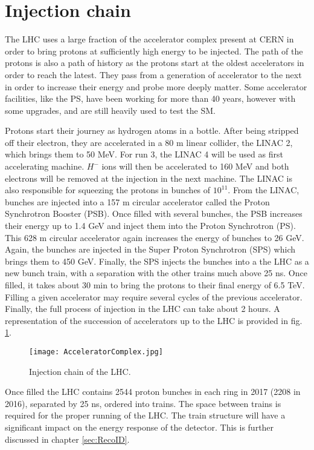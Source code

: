 \section{Injection chain}
\label{sec:org3f71f89}

The LHC uses a large fraction of the accelerator complex present at CERN in order to bring protons at sufficiently high energy to be injected.
The path of the protons is also a path of history as the protons start at the oldest accelerators in order to reach the latest.
They pass from a generation of accelerator to the next in order to increase their energy and probe more deeply matter.
Some accelerator facilities, like the PS, have been working for more than 40 years, however with some upgrades,  and are still heavily used to test the SM.

Protons start their journey as hydrogen atoms in a bottle.
After being stripped off their electron, they are accelerated in a 80 m linear collider, the LINAC 2, which brings them to 50 MeV.
For run 3, the LINAC 4 will be used as first accelerating machine.
$H^-$ ions will then be accelerated to 160 MeV and both electrons will be removed at the injection in the next machine.
The LINAC is also responsible for squeezing the protons in bunches of $10^{11}$.
From the LINAC, bunches are injected into a 157 m circular accelerator called the Proton Synchrotron Booster (PSB).
Once filled with several bunches, the PSB increases their energy up to 1.4 GeV and inject them into the Proton Synchrotron (PS).
This 628 m circular accelerator again increases the energy of bunches to 26 GeV.
Again, the bunches are injected in the Super Proton Synchrotron (SPS) which brings them to 450 GeV.
Finally, the SPS injects the bunches into a the LHC as a new bunch train, with a separation with the other trains much above 25 ns.
Once filled, it takes about 30 min to bring the protons to their final energy of 6.5 TeV.
Filling a given accelerator may require several cycles of the previous accelerator.
Finally, the full process of injection in the LHC can take about 2 hours.
A representation of the succession of accelerators up to the LHC is provided in fig. \ref{fig:orgc7a6b45}.

\begin{figure}[htbp]
\centering
\texttt{[image: AcceleratorComplex.jpg]}
\caption{\label{fig:orgc7a6b45}
Injection chain of the LHC.\cite{AcceleratorComplex}}
\end{figure}


Once filled the LHC contains 2544 proton bunches in each ring in 2017 (2208 in 2016), separated by 25 ns, ordered into trains.
The space between trains is required for the proper running of the LHC.
The train structure will have a significant impact on the energy response of the detector.
This is further discussed in chapter \ref{sec:RecoID}.


